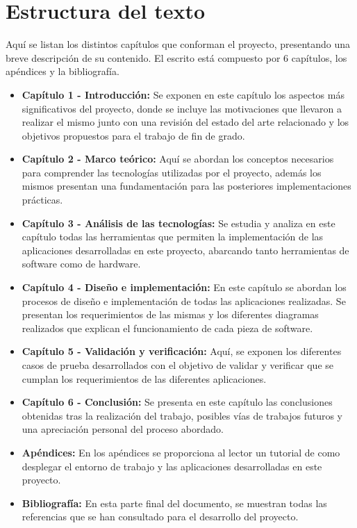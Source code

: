 \section{Estructura del texto}

Aquí se listan los distintos capítulos que conforman el proyecto, presentando una breve descripción de su contenido. El escrito está compuesto por 6 capítulos, los apéndices y la bibliografía.


\begin{itemize}   
    \item \textbf{Capítulo 1 - Introducción:} Se exponen en este capítulo los aspectos más significativos del proyecto, donde se incluye las motivaciones que llevaron a realizar el mismo junto con una revisión del estado del arte relacionado y los objetivos propuestos para el trabajo de fin de grado.

    \item \textbf{Capítulo 2 - Marco teórico:} Aquí se abordan los conceptos necesarios para comprender las tecnologías utilizadas por el proyecto, además los mismos presentan una fundamentación para las posteriores implementaciones prácticas.

    \item \textbf{Capítulo 3 - Análisis de las tecnologías:} Se estudia y analiza en este capítulo todas las herramientas que permiten la implementación de las aplicaciones desarrolladas en este proyecto, abarcando tanto herramientas de software como de hardware.

    \item \textbf{Capítulo 4 - Diseño e implementación:} En este capítulo se abordan los procesos de diseño e implementación de todas las aplicaciones realizadas. Se presentan los requerimientos de las mismas y los diferentes diagramas realizados que explican el funcionamiento de cada pieza de software. 

    \item \textbf{Capítulo 5 - Validación y verificación:} Aquí, se exponen los diferentes casos de prueba desarrollados con el objetivo de validar y verificar que se cumplan los requerimientos de las diferentes aplicaciones.

    \item \textbf{Capítulo 6 - Conclusión:} Se presenta en este capítulo las conclusiones obtenidas tras la realización del trabajo, posibles vías de trabajos futuros y una apreciación personal del proceso abordado.
	
	\item \textbf{Apéndices:} En los apéndices se proporciona al lector un tutorial de como desplegar el entorno de trabajo y las aplicaciones desarrolladas en este proyecto.
    
    \item \textbf{Bibliografía:} En esta parte final del documento, se muestran todas las referencias que se han consultado para el desarrollo del proyecto.   
\end{itemize}

